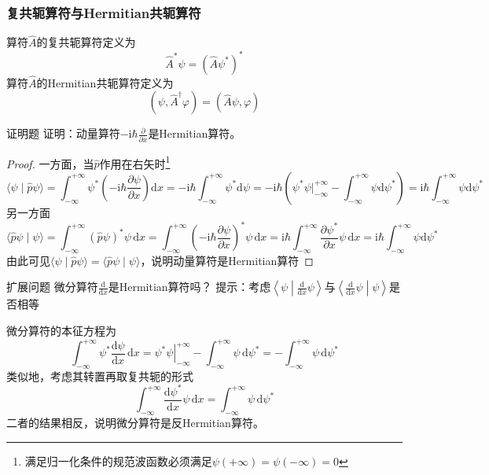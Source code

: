 \subsubsection{复共轭算符与Hermitian共轭算符}
算符$\hat{A}$的复共轭算符定义为
\begin{equation}
    \hat{A}^*\psi = \left(\hat{A}\psi^*\right)^*
\end{equation}
算符$\hat{A}$的Hermitian共轭算符定义为
\begin{equation}
    \left(\psi, \hat{A}^{\dagger}\varphi\right) = \left(\hat{A}\psi, \varphi\right)
\end{equation}
\begin{question}{证明题}
    证明：动量算符$-\mathrm{i}\hbar\frac{\partial}{\partial x}$是Hermitian算符。
\end{question}
\begin{proof}
    一方面，当$\hat{p}$作用在右矢时\footnote{满足归一化条件的规范波函数必须满足$\psi(+\infty)=\psi(-\infty)=0$}
    $$
        \langle \psi\mid\hat{p}\psi \rangle
        = \int_{-\infty}^{+\infty}\psi^*\left(-\mathrm{i}\hbar\frac{\partial \psi}{\partial x}\right)\mathrm{d}x
        =-\mathrm{i}\hbar\int_{-\infty}^{+\infty}\psi^*\mathrm{d}\psi
        =-\mathrm{i}\hbar\left(\psi^*\psi\Big|_{-\infty}^{+\infty} - \int_{-\infty}^{+\infty}\psi\mathrm{d}\psi^*\right)
        =\mathrm{i}\hbar\int_{-\infty}^{+\infty}\psi\mathrm{d}\psi^*
    $$
    另一方面
    $$
        \langle \hat{p}\psi\mid\psi \rangle
        =\int_{-\infty}^{+\infty}\left(\hat{p}\psi\right)^*\psi\,\mathrm{d}x
        =\int_{-\infty}^{+\infty}\left(-\mathrm{i}\hbar\frac{\partial \psi}{\partial x}\right)^*\psi\,\mathrm{d}x
        =\mathrm{i}\hbar\int_{-\infty}^{+\infty}\frac{\partial \psi^*}{\partial x}\psi\,\mathrm{d}x
        =\mathrm{i}\hbar\int_{-\infty}^{+\infty}\psi\mathrm{d}\psi^*
    $$
    由此可见$\langle \psi\mid\hat{p}\psi \rangle=\langle \hat{p}\psi\mid\psi \rangle$，说明动量算符是Hermitian算符
\end{proof}
\begin{question}{扩展问题}
    微分算符$\frac{\mathrm{d}}{\mathrm{d}x}$是Hermitian算符吗？
    \tcblower
    提示：考虑$\left\langle \psi \middle| \frac{\mathrm{d}}{\mathrm{d}x}\psi\right\rangle$与$\left\langle \frac{\mathrm{d}}{\mathrm{d}x}\psi \middle| \psi\right\rangle$是否相等
\end{question}
\begin{solution}
    微分算符的本征方程为
    $$
        \int_{-\infty}^{+\infty}\psi^*\frac{\mathrm{d}\psi}{\mathrm{d}x}\,\mathrm{d}x
        =\left.\psi^*\psi\right|_{-\infty}^{+\infty}-\int_{-\infty}^{+\infty}\psi\,\mathrm{d}\psi^*
        =-\int_{-\infty}^{+\infty}\psi\,\mathrm{d}\psi^*
    $$
    类似地，考虑其转置再取复共轭的形式
    $$
        \int_{-\infty}^{+\infty}\frac{\mathrm{d}\psi^*}{\mathrm{d}x}\psi\,\mathrm{d}x
        =\int_{-\infty}^{+\infty}\psi\,\mathrm{d}\psi^*
    $$
    二者的结果相反，说明微分算符是反Hermitian算符。
\end{solution}

